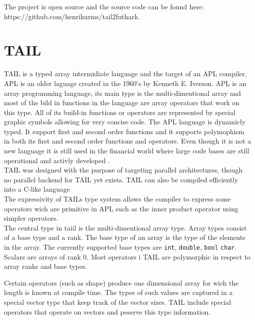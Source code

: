 \documentclass[11pt]{article}
\begin{document}
The project is open source and the source code can be found here:\\ https://github.com/henrikurms/tail2futhark.

\section{TAIL}

TAIL is a typed array intermidiate language and the target of an APL compiler. APL is an older laguage created in the 1960's by Kenneth E. Iverson. APL is an array programming language, its main type is the multi-dimentional array 
and most of the bild in functions in the language are array operators that work on this type. 
All of its build-in functions or operators are represented by special graphic symbols allowing for very concise code.
The APL language is dynamicly typed. It support first and second order functions and it supports polymophism in 
both its first and second order functions and operators. 
Even though it is not a new language it is still used in the financial world 
where large code bases are still operational and activly developed \cite{MartinElsman}. \\

TAIL was designed with the purpose of targeting parallel architectures, though no parallel backend for TAIL yet exists. TAIL can also be compiled efficiently into a C-like language \cite{ElsmanDybdal:Array:2014}\\

The expressivity of TAILs type system allows the compiler to express some operators wich are primitive in APL such as the inner product operator using simpler operators. \\

The central type in taiil is the multi-dimentional array type. Array types consist of a base type and a rank. The base type of an array is the type of the elements in the array.  The currently supported base types are {\tt int}, {\tt double}, {\tt bool} {\tt char}. Scalars are arrays of rank 0. Most operators i TAIL are polymorphic in respect to array ranks and base types. 

Certain operators (such as shape) produce one dimensional array for wich the length is known at compile time. The types of such values are captured in a special vector type that keep track of the vector sizes. 
TAIL include special operators that operate on vectors and peserve this type information. 
\end{document}
